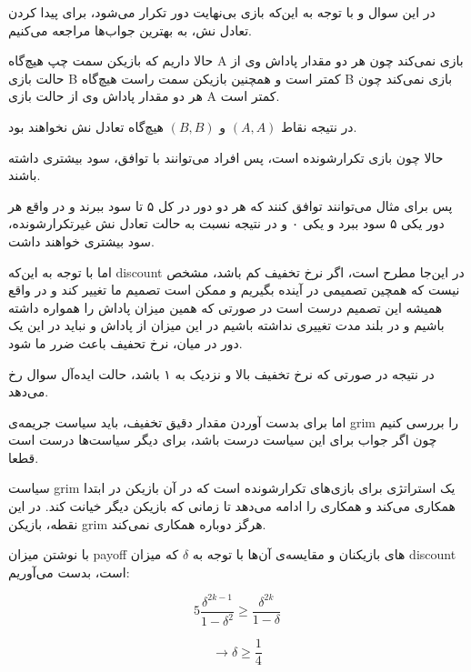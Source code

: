 در این سوال و با توجه به این‌که بازی بی‌نهایت دور تکرار می‌شود، برای پیدا کردن تعادل نش، به بهترین جواب‌ها مراجعه می‌کنیم.


حالا داریم که بازیکن سمت چپ هیچ‌گاه A بازی نمی‌کند چون هر دو مقدار پاداش وی از حالت بازی B کمتر است و همچنین بازیکن سمت راست هیچ‌گاه B بازی نمی‌کند چون هر دو مقدار پاداش وی از حالت بازی A کمتر است.


در نتیجه نقاط
$(A, A)$
و
$(B, B)$
هیچ‌گاه تعادل نش نخواهند بود.


حالا چون بازی تکرارشونده است، پس افراد می‌توانند با توافق، سود بیشتری داشته باشند.


پس برای مثال می‌توانند توافق کنند که هر دو دور در کل ۵ تا سود ببرند و در واقع هر دور یکی ۵ سود ببرد و یکی ۰ و در نتیجه نسبت به حالت تعادل نش غیرتکرارشونده، سود بیشتری خواهند داشت.


اما با توجه به این‌که discount در این‌جا مطرح است، اگر نرخ تخفیف کم باشد، مشخص نیست که همچین تصمیمی در آینده بگیریم و ممکن است تصمیم ما تغییر کند و در واقع همیشه این تصمیم درست است در صورتی که همین میزان پاداش را همواره داشته باشیم و در بلند مدت تغییری نداشته باشیم در این میزان از پاداش و نباید در این یک دور در میان، نرخ تحفیف باعث ضرر ما شود.

در نتیجه در صورتی که نرخ تخفیف بالا و نزدیک به ۱ باشد، حالت ایده‌آل سوال رخ می‌دهد.

اما برای بدست آوردن مقدار دقیق تخفیف، باید سیاست جریمه‌ی grim را بررسی کنیم چون اگر جواب برای این سیاست درست باشد، برای دیگر سیاست‌ها درست است قطعا.

سیاست grim یک استراتژی برای بازی‌های تکرارشونده است که در آن بازیکن در ابتدا همکاری می‌کند و همکاری را ادامه می‌دهد تا زمانی که بازیکن دیگر خیانت کند. در این نقطه، بازیکن grim هرگز دوباره همکاری نمی‌کند.

با نوشتن میزان payoff های بازیکنان و مقایسه‌ی آن‌ها با توجه به 
$\delta$
که میزان discount است، بدست می‌آوریم:

$$
5 \frac{\delta^{2k-1}}{1 - \delta^2} \geq \frac{\delta^{2k}}{1 - \delta} 
$$

$$
\rightarrow \delta \geq \frac{1}{4}
$$